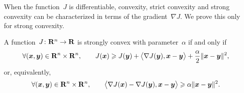 When the function~$J$ is differentiable,
convexity, strict convexity and strong convexity can be characterized in terms of the gradient~$\nabla J$.
We prove this only for strong convexity.

\begin{proposition}
    A function~$J\colon \mathbf R^n \to \mathbf R$ is strongly convex with parameter~$\alpha$ if and only if
    \begin{equation}
        \label{eq:strong_convex_eq1}
        \forall (\vect x, \vect y) \in \real^n \times \real^n,
        \qquad J(\vect x) \geq J(\vect y) + \ip[\big]{\nabla J(\vect y), \vect x - \vect y} + \frac{\alpha}{2} \norm{\vect x - \vect y}^2,
    \end{equation}
    or, equivalently,
    \begin{equation}
        \label{eq:strong_convex_eq2}
        \forall (\vect x, \vect y) \in \real^n \times \real^n,
        \qquad \ip[\big]{\nabla J(\vect x) - \nabla J(\vect y), \vect x - \vect y}
        \geq \alpha \norm{\vect x - \vect y}^2.
    \end{equation}
\end{proposition}
